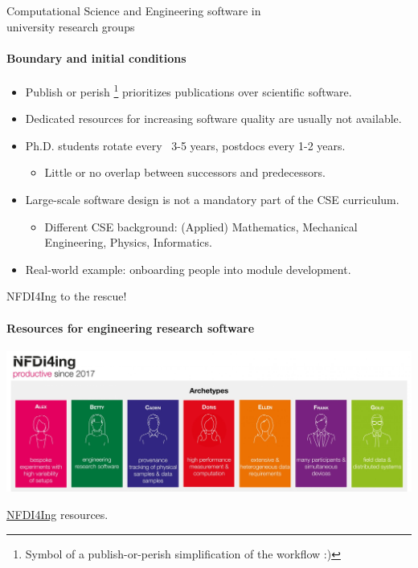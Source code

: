 

\begin{frame}{Computational Science and Engineering software in\\university research groups}
	\framesubtitle{Boundary and initial conditions}
	
	\vfill
	\begin{itemize}
            \item Publish or perish \faGraduationCap\footnote{Symbol of a publish-or-perish simplification of the workflow :)} prioritizes publications over scientific software.
		\item Dedicated resources for increasing software quality are usually not available.
		\item Ph.D. students rotate every ~3-5 years, postdocs every 1-2 years. 
			\begin{itemize}
				\item Little or no overlap between successors and predecessors. 
			\end{itemize}
		\item Large-scale software design is not a mandatory part of the CSE curriculum. 
			\begin{itemize}
				\item Different CSE background: (Applied) Mathematics, Mechanical Engineering, Physics, Informatics.
			\end{itemize}
		\item Real-world example: onboarding people into \href{https://www.openfoam.com/documentation/guides/latest/api/classes.html}{} module development.
	\end{itemize}
\end{frame}

\begin{frame}{NFDI4Ing to the rescue!}
\framesubtitle{Resources for engineering research software}
    \vfill

    \begin{center}
    \includegraphics[width=\textwidth]{figures/nfdi4ing.jpg}
    \end{center}
    \href{https://nfdi4ing.de}{NFDI4Ing} resources. 

\end{frame}

